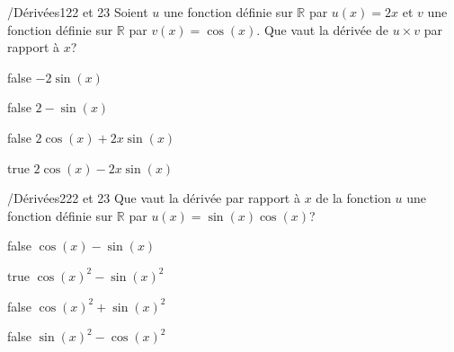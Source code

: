         	\begin{question}{/}{Dérivées}{1}{22 et 23}
				Soient $u$ une fonction définie sur $\mathbb{R}$ par $u(x)=2x$ et $v$ une fonction définie sur $\mathbb{R}$ par  $v(x)=\cos(x)$. Que vaut la dérivée de $u\times v$ par rapport à $x$?
            \end{question}
            \begin{reponses}
            	\item[false] $-2\sin(x)$
            	\item[false] $2-\sin(x)$
                \item[false] $2\cos(x)+2x\sin(x)$
                \item[true] $2\cos(x)-2x\sin(x)$
            \end{reponses}
            \begin{question}{/}{Dérivées}{2}{22 et 23}
                Que vaut la dérivée par rapport à $x$ de la fonction $u$ une fonction définie sur $\mathbb{R}$ par $u(x)=\sin(x)\cos(x)$?
            \end{question}
            \begin{reponses}
                \item[false] $\cos(x)-\sin(x)$
                \item[true] $\cos(x)^2-\sin(x)^2$
                \item[false] $\cos(x)^2+\sin(x)^2$
                \item[false] $\sin(x)^2-\cos(x)^2$
            \end{reponses}
